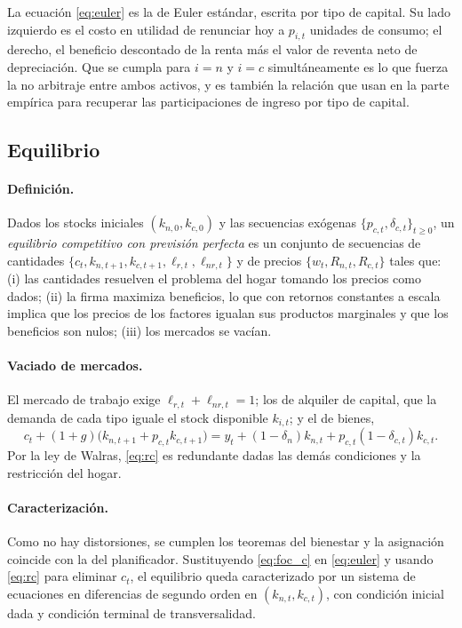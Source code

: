 \documentclass[12pt,letterpaper]{article}
\newcommand{\lrt}{\ell_{r,t}}
\newcommand{\lnrt}{\ell_{nr,t}}
\begin{document}
La ecuación \eqref{eq:euler} es la de Euler estándar, escrita por tipo de capital.
Su lado izquierdo es el costo en utilidad de renunciar hoy a $p_{i,t}$ unidades de
consumo; el derecho, el beneficio descontado de la renta más el valor de reventa neto
de depreciación. Que se cumpla para $i=n$ y $i=c$ simultáneamente es lo que fuerza la
no arbitraje entre ambos activos, y es también la relación que \citet{eden2018} usan
en la parte empírica para recuperar las participaciones de ingreso por tipo de capital.

\subsection{Equilibrio}

\paragraph{Definición.}
Dados los stocks iniciales $(k_{n,0},k_{c,0})$ y las secuencias exógenas
$\{p_{c,t},\delta_{c,t}\}_{t\ge 0}$, un \emph{equilibrio competitivo con previsión
perfecta} es un conjunto de secuencias de cantidades
$\{c_{t},k_{n,t+1},k_{c,t+1},\lrt,\lnrt\}$ y de precios $\{w_{t},R_{n,t},R_{c,t}\}$
tales que: (i) las cantidades resuelven el problema del hogar tomando los precios
como dados; (ii) la firma maximiza beneficios, lo que con retornos constantes a
escala implica que los precios de los factores igualan sus productos marginales y
que los beneficios son nulos; (iii) los mercados se vacían.

\paragraph{Vaciado de mercados.}
El mercado de trabajo exige $\lrt+\lnrt=1$; los de alquiler de capital, que la
demanda de cada tipo iguale el stock disponible $k_{i,t}$; y el de bienes,
\begin{equation}
c_{t} + (1+g)\big(k_{n,t+1} + p_{c,t}k_{c,t+1}\big)
= y_{t} + (1-\delta_{n})k_{n,t} + p_{c,t}(1-\delta_{c,t})k_{c,t}.
\label{eq:rc}
\end{equation}
Por la ley de Walras, \eqref{eq:rc} es redundante dadas las demás condiciones y la
restricción del hogar.

\paragraph{Caracterización.}
Como no hay distorsiones, se cumplen los teoremas del bienestar y la asignación
coincide con la del planificador. Sustituyendo \eqref{eq:foc_c} en \eqref{eq:euler}
y usando \eqref{eq:rc} para eliminar $c_t$, el equilibrio queda caracterizado por un
sistema de ecuaciones en diferencias de segundo orden en $(k_{n,t},k_{c,t})$, con
condición inicial dada y condición terminal de transversalidad.
\end{document}
